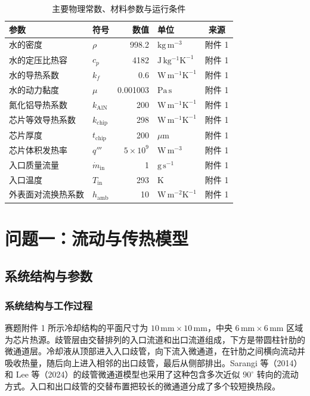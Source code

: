 \documentclass[withoutpreface,bwprint]{cumcmthesis}
\begin{document}
\begin{table}[H]
\centering
\caption{主要物理常数、材料参数与运行条件}
\label{tab:physical-parameters}
\small
\begin{tabular}{llrlc}
\toprule
参数 & 符号 & 数值 & 单位 & 来源\\
\midrule
水的密度 & $\rho$ & 998.2 & $\mathrm{kg\,m^{-3}}$ & 附件 1\\
水的定压比热容 & $c_p$ & 4182 & $\mathrm{J\,kg^{-1}K^{-1}}$ & 附件 1\\
水的导热系数 & $k_f$ & 0.6 & $\mathrm{W\,m^{-1}K^{-1}}$ & 附件 1\\
水的动力黏度 & $\mu$ & 0.001003 & $\mathrm{Pa\,s}$ & 附件 1\\
氮化铝导热系数 & $k_{\mathrm{AlN}}$ & 200 & $\mathrm{W\,m^{-1}K^{-1}}$ & 附件 1\\
芯片等效导热系数 & $k_{\mathrm{chip}}$ & 298 & $\mathrm{W\,m^{-1}K^{-1}}$ & 附件 1\\
芯片厚度 & $t_{\mathrm{chip}}$ & 200 & $\mu\mathrm{m}$ & 附件 1\\
芯片体积发热率 & $q'''$ & $5\times10^9$ & $\mathrm{W\,m^{-3}}$ & 附件 1\\
入口质量流量 & $\dot m_{\mathrm{in}}$ & 1 & $\mathrm{g\,s^{-1}}$ & 附件 1\\
入口温度 & $T_{\mathrm{in}}$ & 293 & $\mathrm K$ & 附件 1\\
外表面对流换热系数 & $h_{\mathrm{amb}}$ & 10 & $\mathrm{W\,m^{-2}K^{-1}}$ & 附件 1\\
\bottomrule
\end{tabular}
\end{table}

\section{问题一：流动与传热模型}
\subsection{系统结构与参数}
\subsubsection{系统结构与工作过程}
赛题附件 1 所示冷却结构的平面尺寸为 $10\,\mathrm{mm}\times10\,\mathrm{mm}$，中央 $6\,\mathrm{mm}\times6\,\mathrm{mm}$ 区域为芯片热源。歧管层由交替排列的入口流道和出口流道组成，下方是带圆柱针肋的微通道层。冷却液从顶部进入入口歧管，向下流入微通道，在针肋之间横向流动并吸收热量，随后向上进入相邻的出口歧管，最后从侧部排出。Sarangi 等（2014）和 Lee 等（2024）的歧管微通道模型也采用了这种包含多次近似 $90^\circ$ 转向的流动方式\cite{Sarangi2014,Lee2024}。入口和出口歧管的交替布置把较长的微通道分成了多个较短换热段。
\end{document}

